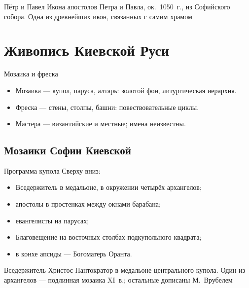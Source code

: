\begin{frame}{Пётр и Павел}
    {Икона апостолов Петра и Павла, ок.\ 1050~г.,
     из Софийского собора. Одна из древнейших икон,
     связанных с самим храмом}
\end{frame}

\section{Живопись Киевской Руси}

\begin{frame}{Мозаика и фреска}
  \begin{itemize}
    \item Мозаика --- купол, паруса, алтарь: золотой фон,
          литургическая иерархия.
    \item Фреска --- стены, столпы, башни: повествовательные циклы.
    \item Мастера --- византийские и местные; имена неизвестны.
  \end{itemize}
\end{frame}

\subsection{Мозаики Софии Киевской}

\begin{frame}{Программа купола}
  Сверху вниз:
  \begin{itemize}
    \item Вседержитель в медальоне, в окружении четырёх архангелов;
    \item апостолы в простенках между окнами барабана;
    \item евангелисты на парусах;
    \item Благовещение на восточных столбах
          подкупольного квадрата;
    \item в конхе апсиды --- Богоматерь Оранта.
  \end{itemize}
\end{frame}

\begin{frame}{Вседержитель}
    {Христос Пантократор в медальоне центрального купола.
     Один из архангелов --- подлинная мозаика XI~в.;
     остальные дописаны М.~Врубелем}
\end{frame}

